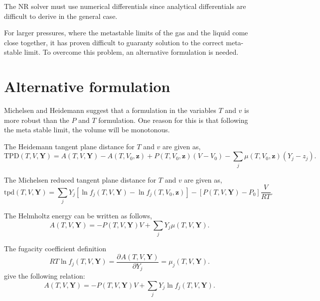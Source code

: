 \documentclass[internal,english]{sintefmemo2012}
\newcommand*{\pd}[3][]{\frac{\partial^{#1}#2}{\partial{#3}^{#1}}}%
\newcommand{\tpd}{\ensuremath{\text{tpd}}\xspace}
\newcommand{\TPD}{\ensuremath{\text{TPD}}\xspace}
\begin{document}
The NR solver must use numerical differentials since analytical
differentials are difficult to derive in the general case.

For larger pressures, where the metastable limits of the gas and the
liquid come close together, it has proven difficult to guaranty
solution to the correct meta-stable limit. To overcome this problem,
an alternative formulation is needed.

\section{Alternative formulation}
Michelsen and Heidemann \cite{Heidemann1980} suggest that a
formulation in the variables $T$ and $v$ is more robust than the $P$
and $T$ formulation. One reason for this is that following the meta
stable limit, the volume will be monotonous.

The Heidemann tangent plane distance for $T$ and $v$ are given as,
\begin{equation}
  \label{eq:tpd_TV}
  \TPD\left(T,V,\mathbf{Y}\right) =
 A\left(T,V,\mathbf{Y}\right) - A\left(T,V_0,\mathbf{z}\right) +
 P\left(T,V_0,\mathbf{z}\right)\left(V - V_0\right) -
 \underset{j}{\sum}\mu\left(T,V_0,\mathbf{z}\right)\left(Y_j - z_j\right)
 .
\end{equation}

The Michelsen \citet[Chap. 9]{Michelsen2007} reduced tangent plane distance for $T$ and $v$ are given as,
\begin{equation}
  \label{eq:tpd_TV_M}
  \tpd(T,V,\mathbf{Y}) =
  \underset{j}{\sum}Y_j\left[\ln f_j \left(T,V,\mathbf{Y}\right) -
    \ln f_j\left(T,V_0,\mathbf{z}\right)\right] -
  \left[P\left(T,V,\mathbf{Y}\right) - P_0\right]\frac{V}{RT}
  .
\end{equation}

The Helmholtz energy can be written as follows,
\begin{equation}
  \label{eq:A}
 A\left(T,V,\mathbf{Y}\right) = - P\left(T,V,\mathbf{Y}\right)V +
 \underset{j}{\sum}Y_j\mu\left(T,V,\mathbf{Y}\right)
 .
\end{equation}

The fugacity coefficient definition
\begin{equation}
  \label{eq:fugacity}
  R T \ln f_j\left(T,V,\mathbf{Y}\right) =
  \pd{A\left(T,V,\mathbf{Y}\right)}{Y_j} = \mu_j \left(T,V,\mathbf{Y}\right).
\end{equation}
give the following relation:
\begin{equation}
  \label{eq:A2}
 A\left(T,V,\mathbf{Y}\right) = - P\left(T,V,\mathbf{Y}\right)V +
 \underset{j}{\sum}Y_j\ln f_j\left(T,V,\mathbf{Y}\right).
\end{equation}
\end{document}
